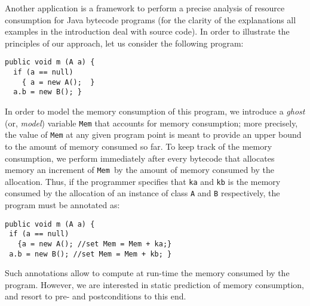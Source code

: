 
Another application is a framework to perform a precise analysis of resource consumption for
Java bytecode programs (for the clarity of the explanations all
examples in the introduction deal with source code).  In order
to illustrate the principles of our approach, let us consider the
following program:
\begin{verbatim}
public void m (A a) {
  if (a == null) 
    { a = new A();  }  
  a.b = new B(); }
\end{verbatim}
In order to model the memory consumption of this program, we introduce
a {\em ghost} (or, {\em model}) variable \verb!Mem! that accounts for
memory consumption; more precisely, the value of \verb!Mem! at any
given program point is meant to provide an upper bound to the amount
of memory consumed so far. To keep track of the memory consumption, we
perform immediately after every bytecode that allocates memory an
increment of \verb!Mem!\ by the amount of memory consumed by the
allocation. Thus, if the programmer specifies that \verb!ka! and
\verb!kb! is the memory consumed by the allocation of an instance of
class \verb!A! and \verb!B! respectively, the program must be
annotated as:
\begin{verbatim} 
public void m (A a) {
 if (a == null) 
   {a = new A(); //set Mem = Mem + ka;}  
 a.b = new B(); //set Mem = Mem + kb; }
\end{verbatim}
Such annotations allow to compute at run-time the memory consumed by
the program. However, we are interested in static prediction of memory
consumption, and resort to pre- and postconditions to this end.  

